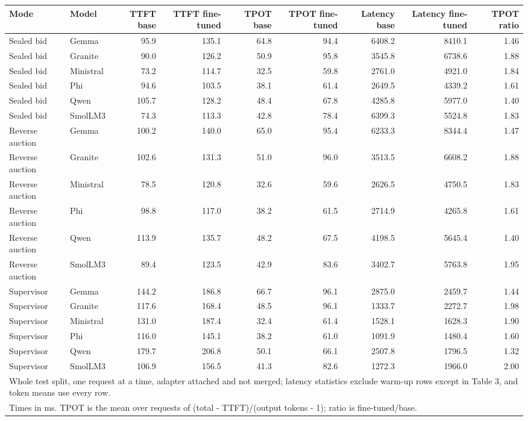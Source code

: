 \begin{tabular}{llrrrrrrr}
\toprule
Mode & Model & TTFT base & TTFT fine-tuned & TPOT base & TPOT fine-tuned & Latency base & Latency fine-tuned & TPOT ratio \\
\midrule
Sealed bid & Gemma & 95.9 & 135.1 & 64.8 & 94.4 & 6408.2 & 8410.1 & 1.46 \\
Sealed bid & Granite & 90.0 & 126.2 & 50.9 & 95.8 & 3545.8 & 6738.6 & 1.88 \\
Sealed bid & Ministral & 73.2 & 114.7 & 32.5 & 59.8 & 2761.0 & 4921.0 & 1.84 \\
Sealed bid & Phi & 94.6 & 103.5 & 38.1 & 61.4 & 2649.5 & 4339.2 & 1.61 \\
Sealed bid & Qwen & 105.7 & 128.2 & 48.4 & 67.8 & 4285.8 & 5977.0 & 1.40 \\
Sealed bid & SmolLM3 & 74.3 & 113.3 & 42.8 & 78.4 & 6399.3 & 5524.8 & 1.83 \\
Reverse auction & Gemma & 100.2 & 140.0 & 65.0 & 95.4 & 6233.3 & 8344.4 & 1.47 \\
Reverse auction & Granite & 102.6 & 131.3 & 51.0 & 96.0 & 3513.5 & 6608.2 & 1.88 \\
Reverse auction & Ministral & 78.5 & 120.8 & 32.6 & 59.6 & 2626.5 & 4750.5 & 1.83 \\
Reverse auction & Phi & 98.8 & 117.0 & 38.2 & 61.5 & 2714.9 & 4265.8 & 1.61 \\
Reverse auction & Qwen & 113.9 & 135.7 & 48.2 & 67.5 & 4198.5 & 5645.4 & 1.40 \\
Reverse auction & SmolLM3 & 89.4 & 123.5 & 42.9 & 83.6 & 3402.7 & 5763.8 & 1.95 \\
Supervisor & Gemma & 144.2 & 186.8 & 66.7 & 96.1 & 2875.0 & 2459.7 & 1.44 \\
Supervisor & Granite & 117.6 & 168.4 & 48.5 & 96.1 & 1333.7 & 2272.7 & 1.98 \\
Supervisor & Ministral & 131.0 & 187.4 & 32.4 & 61.4 & 1528.1 & 1628.3 & 1.90 \\
Supervisor & Phi & 116.0 & 145.1 & 38.2 & 61.0 & 1091.9 & 1480.4 & 1.60 \\
Supervisor & Qwen & 179.7 & 206.8 & 50.1 & 66.1 & 2507.8 & 1796.5 & 1.32 \\
Supervisor & SmolLM3 & 106.9 & 156.5 & 41.3 & 82.6 & 1272.3 & 1966.0 & 2.00 \\
\bottomrule
\multicolumn{9}{l}{\footnotesize Whole test split, one request at a time, adapter attached and not merged; latency statistics exclude warm-up rows except in Table 3, and token means use every row.} \\
\multicolumn{9}{l}{\footnotesize Times in ms. TPOT is the mean over requests of (total - TTFT)/(output tokens - 1); ratio is fine-tuned/base.} \\
\end{tabular}
